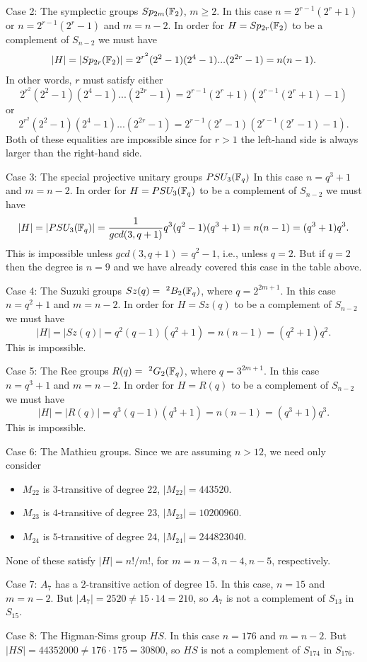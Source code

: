 Case 2: The symplectic groups $Sp_{2m}({{\Bbb F}}_2)$, $m\geq 2$.
In this case $n=2^{r-1}(2^r+1)$ or $n=2^{r-1}(2^r-1)$ 
and $m=n-2$. In order
for $H=Sp_{2r}({{\Bbb F}}_2)$ to be a complement
of $S_{n-2}$ we must have
\[
|H|=|Sp_{2r}({{\Bbb F}}_2)|=2^{r^2}(2^2-1)(2^4-1)...(2^{2r } -1)
=n(n-1).
\]
In other words, $r$ must satisfy either
\[
2^{r^2}(2^2-1)(2^4-1)...(2^{2r } -1)
=2^{r-1}(2^r+1)(2^{r-1}(2^r+1)-1)
\]
or
\[
2^{r^2}(2^2-1)(2^4-1)...(2^{2r } -1)
=2^{r-1}(2^r-1)(2^{r-1}(2^r-1)-1).
\]
Both of these equalities are impossible since
for $r>1$ the left-hand side is always larger than
the right-hand side.

Case 3: The special projective unitary groups 
$PSU_3({{\Bbb F}}_q)$
In this case $n=q^3+1$ and $m=n-2$. In order
for $H=PSU_3({{\Bbb F}}_q)$ to be a complement
of $S_{n-2}$ we must have
\[
|H|=|PSU_3({{\Bbb F}}_q)|=
{1\over gcd(3,q+1)}q^3(q^2-1)(q^3+1)
=n(n-1)=(q^3+1)q^3.
\]
This is impossible unless $gcd(3,q+1)=q^2-1$, i.e., unless
$q=2$. But if $q=2$ then the degree is $n=9$ and we have
already covered this case in the table above.

Case 4: The Suzuki groups $Sz(q)=\ ^2B_2({{\Bbb F}}_q)$,
where $q=2^{2m+1}$. In this case $n=q^2+1$ and $m=n-2$. In order
for $H=Sz(q)$ to be a complement of $S_{n-2}$ we must have
\[
|H|=|Sz(q)|=q^2(q-1)(q^2+1)
=n(n-1)=(q^2+1)q^2.
\]
This is impossible.

Case 5: The Ree groups $R(q)=\ ^2G_2({{\Bbb F}}_q)$,
where $q=3^{2m+1}$. In this case $n=q^3+1$ and $m=n-2$. In order
for $H=R(q)$ to be a complement of $S_{n-2}$ we must have
\[
|H|=|R(q)|=q^3(q-1)(q^3+1)
=n(n-1)=(q^3+1)q^3.
\]
This is impossible.

Case 6: The Mathieu groups. Since we are assuming $n>12$, we need 
only consider
\begin{itemize}
\item
$M_{22}$ is $3$-transitive of degree $22$, 
$|M_{22}|=443520$.
\item
$M_{23}$ is $4$-transitive of degree $23$, 
$|M_{23}|=10200960$.
\item
$M_{24}$ is $5$-transitive of degree $24$,
$|M_{24}|=244823040$.  
\end{itemize}
None of these satisfy $|H|=n!/m!$, for $m=n-3,n-4,n-5$, 
respectively.

Case 7: $A_7$ has a $2$-transitive action of degree $15$.
In this case, $n=15$ and $m=n-2$. But
$|A_7|=2520\not= 15\cdot 14=210$, so $A_7$ is not 
a complement of $S_{13}$ in $S_{15}$.

Case 8: The Higman-Sims group $HS$. In this case $n=176$ and
$m=n-2$. But
$|HS|=44352000\not= 176\cdot 175= 30800$, so $HS$ is not 
a complement of $S_{174}$ in $S_{176}$.

